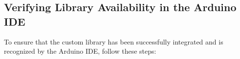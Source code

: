 {%
%
%
%
%	
%	
%	
%	
%	
%	
%	
%	
%		
%		
%		
%
%		
%
%
%
%
%
%
%
%
%
%
%
%
%
%
%
%
%
%
%
%
%
%



\subsection{Verifying Library Availability in the Arduino IDE}

To ensure that the custom library has been successfully integrated and is recognized by the Arduino IDE, follow these steps:

\begin{enumerate}
	

\end{enumerate}}
